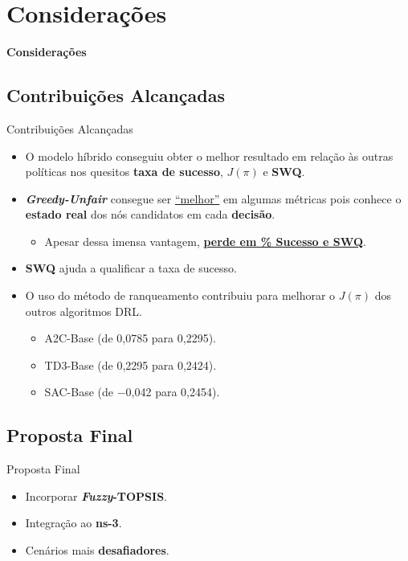 \documentclass[aspectratio=169]{beamer}
\begin{document}
\section{Considerações}
\begin{frame}
    \centering
    \Huge \textbf{Considerações}
\end{frame}

\subsection{Contribuições Alcançadas}
\begin{frame}{Contribuições Alcançadas}
    \begin{itemize}
        \item O modelo híbrido conseguiu obter o melhor resultado em relação às outras políticas
        nos quesitos \textbf{taxa de sucesso}, \textbf{$J(\pi)$} e \textbf{SWQ}.
        \item \textbf{\textit{Greedy-Unfair}} consegue ser \underline{``melhor''} em algumas métricas pois conhece o \textbf{estado real} dos nós candidatos em cada \textbf{decisão}.  
        \begin{itemize}
            \item Apesar dessa imensa vantagem, \underline{\textbf{perde em \% Sucesso e SWQ}}.
        \end{itemize}
        \item \textbf{SWQ} ajuda a qualificar a taxa de sucesso.
        \item O uso do método de ranqueamento contribuiu para melhorar o $J(\pi)$ dos outros algoritmos DRL.
        \begin{itemize}
            \item A2C-Base (de 0,0785 para 0,2295).
            \item TD3-Base (de 0,2295 para 0,2424).
            \item SAC-Base (de $-$0,042 para 0,2454).
        \end{itemize}
    \end{itemize}
\end{frame}

\subsection{Proposta Final}
\begin{frame}{Proposta Final}
    \begin{itemize}
        \item Incorporar \textbf{\textit{Fuzzy}-TOPSIS}.
        \item Integração ao \textbf{ns-3}.
        \item Cenários mais \textbf{desafiadores}.
    \end{itemize}
\end{frame}
\end{document}
